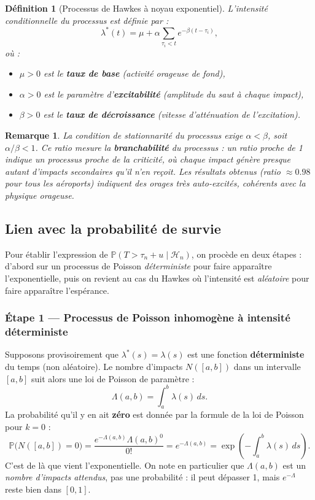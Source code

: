 \documentclass[a4paper,11pt]{article}
\newtheorem{definition}{Définition}[section]
\newtheorem{remarque}{Remarque}[section]
\begin{document}
\begin{definition}[Processus de Hawkes à noyau exponentiel]
L'intensité conditionnelle du processus est définie par :
\[
\lambda^*(t) = \mu + \alpha \sum_{\tau_i < t} e^{-\beta(t - \tau_i)},
\]
où :
\begin{itemize}
    \item $\mu > 0$ est le \textbf{taux de base} (activité orageuse de fond),
    \item $\alpha > 0$ est le paramètre d'\textbf{excitabilité} (amplitude du saut à chaque impact),
    \item $\beta > 0$ est le \textbf{taux de décroissance} (vitesse d'atténuation de l'excitation).
\end{itemize}
\end{definition}

\begin{remarque}
La condition de stationnarité du processus exige $\alpha < \beta$, soit $\alpha/\beta < 1$. Ce ratio mesure la \textbf{branchabilité} du processus : un ratio proche de 1 indique un processus proche de la criticité, où chaque impact génère presque autant d'impacts secondaires qu'il n'en reçoit. Les résultats obtenus (ratio $\approx 0.98$ pour tous les aéroports) indiquent des orages très auto-excités, cohérents avec la physique orageuse.
\end{remarque}

\subsection{Lien avec la probabilité de survie}

Pour établir l'expression de $\mathbb{P}(T > \tau_n + u \mid \mathcal{H}_n)$,
on procède en deux étapes : d'abord sur un processus de Poisson
\emph{déterministe} pour faire apparaître l'exponentielle, puis on
revient au cas du Hawkes où l'intensité est \emph{aléatoire} pour
faire apparaître l'espérance.

\subsubsection*{Étape 1 — Processus de Poisson inhomogène à intensité
déterministe}

Supposons provisoirement que $\lambda^*(s) = \lambda(s)$ est une
fonction \textbf{déterministe} du temps (non aléatoire). Le nombre
d'impacts $N([a,b])$ dans un intervalle $[a,b]$ suit alors une loi de
Poisson de paramètre :
\[
    \Lambda(a,b) = \int_a^b \lambda(s)\,ds.
\]
La probabilité qu'il y en ait \textbf{zéro} est donnée par la formule
de la loi de Poisson pour $k = 0$ :
\[
    \mathbb{P}\!\bigl(N([a,b]) = 0\bigr)
    = \frac{e^{-\Lambda(a,b)} \Lambda(a,b)^0}{0!}
    = e^{-\Lambda(a,b)}
    = \exp\!\left(-\int_a^b \lambda(s)\,ds\right).
\]
C'est de là que vient l'exponentielle. On note en particulier que
$\Lambda(a,b)$ est un \emph{nombre d'impacts attendus}, pas une
probabilité : il peut dépasser 1, mais $e^{-\Lambda}$ reste bien dans
$[0,1]$.
\end{document}
